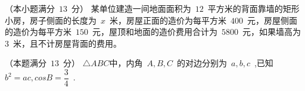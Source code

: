 \documentclass{BHCexam}
\begin{document}
\begin{questions}
\vspace{8cm}
\question （本小题满分~$13$~分）
某单位建造一间地面面积为~$12$~平方米的背面靠墙的矩形小房，房子侧面的长度为~$x$~米，房屋正面的造价为每平方米~$400$~元，房屋侧面的造价为每平方米~$150$~元，屋顶和地面的造价费用合计为~$5800$~元，如果墙高为~$3$~米，且不计房屋背面的费用。
\vspace{7cm}
\question （本题满分~$13$~分）
$\triangle ABC$中，内角~$A,B,C$~的对边分别为~$a,b,c$~,已知~$b^2=ac,cosB=\dfrac{3}{4}$~.

\end{questions}
\end{document}
